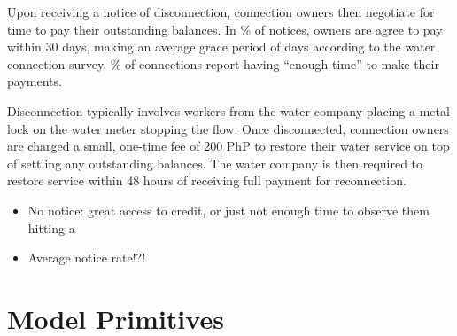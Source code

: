 \documentclass[12pt]{article}
\begin{document}


Upon receiving a notice of disconnection, connection owners then negotiate for time to pay their outstanding balances.  In \unskip\% of notices, owners are agree to pay within 30 days, making an average grace period of days according to the water connection survey.  \unskip\% of connections report having ``enough time'' to make their payments.  


Disconnection typically involves workers from the water company placing a metal lock on the water meter stopping the flow.  Once disconnected, connection owners are charged a small, one-time fee of 200 PhP to restore their water service on top of settling any outstanding balances.  The water company is then required to restore service within 48 hours of receiving full payment for reconnection.





\begin{itemize}
	\item No notice: great access to credit, or just not enough time to observe them hitting a
	\item Average notice rate!?!

\end{itemize}












\section{Model Primitives}
\end{document}
